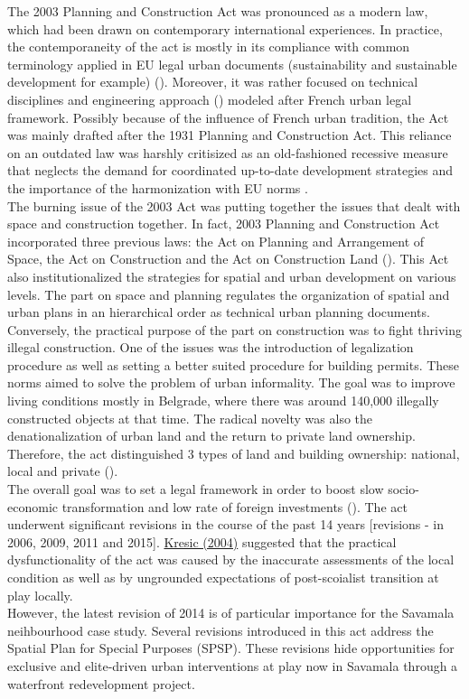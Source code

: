 \documentclass[11pt]{report}
\begin{document}
\begin{itemize}
The 2003 Planning and Construction Act was pronounced as a modern law, which had been drawn on contemporary international experiences. In practice, the contemporaneity of the act is mostly in its compliance with common terminology applied in EU legal urban documents (sustainability and sustainable development for example) (\cite{Zakon 2003}).
Moreover, it was rather focused on technical disciplines and engineering approach (\href{}{\citealt{nedovicbudic_waves_2006}}) modeled after French urban legal framework.
Possibly because of the influence of French urban tradition, the Act was mainly drafted after the 1931 Planning and Construction Act.
This reliance on an outdated law was harshly critisized as an old-fashioned  recessive measure that neglects the demand for coordinated up-to-date development strategies and the importance of the harmonization with EU norms \cite{ref}.
\\
The burning issue of the 2003 Act was putting together the issues that dealt with space and construction together. In fact, 2003 Planning and Construction Act incorporated three previous laws: the Act on Planning and Arrangement of Space, the Act on Construction and the Act on Construction Land (\cite{ref}).
This Act also institutionalized the strategies for spatial and urban development on various levels.
The part on space and planning regulates the organization of spatial and urban plans in an hierarchical order as technical urban planning documents.
Conversely, the practical purpose of the part on construction was to fight thriving illegal construction.
One of the issues was the introduction of legalization procedure as well as setting a better suited procedure for building permits. 
These norms aimed to solve the problem of urban informality.
The goal was to improve living conditions mostly in Belgrade, where there was around 140,000 illegally constructed objects at that time.
The radical novelty was also the denationalization of urban land and the return to private land ownership. Therefore, the act distinguished 3 types of land and building ownership: national, local and private (\href{}{\citealt{vujosevic_planning_2006}}).
\\
The overall goal was to set a legal framework in order to boost slow socio-economic transformation and low rate of foreign investments (\href{}{\citealt{vujovic_belgrades_2007}}).
The act underwent significant revisions in the course of the past 14 years [revisions - in 2006, 2009, 2011 and 2015].
\href{}{Kresic (2004)} suggested that the practical dysfunctionality of the act was caused by the inaccurate assessments of the local condition as well as by ungrounded expectations of post-scoialist transition at play locally.
\\
However, the latest revision of 2014 is of particular importance for the Savamala neihbourhood case study. Several revisions introduced in this act address the Spatial Plan for Special Purposes (SPSP). These revisions hide opportunities for exclusive and elite-driven urban interventions at play now in Savamala through a waterfront redevelopment project. 


\end{itemize}
\end{document}
